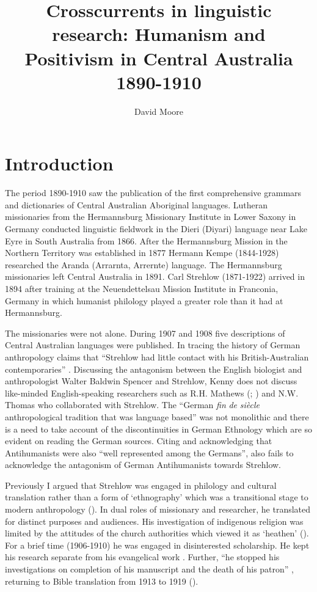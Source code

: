 \documentclass[output=paper]{langsci/langscibook}
\author{David Moore\affiliation{University of Western Australia}\orcid{}}
\title{Crosscurrents in linguistic research: Humanism and Positivism in Central Australia 1890-1910}
\begin{document}
\maketitle

\section{Introduction} 

 The period 1890-1910 saw the publication of the first comprehensive grammars and dictionaries of Central  Australian Aboriginal languages. Lutheran missionaries from the Hermannsburg Missionary Institute in Lower Saxony in Germany conducted linguistic fieldwork in the Dieri (Diyari) language near Lake Eyre in South Australia from 1866. After the Hermannsburg Mission in the Northern Territory was established in 1877 Hermann Kempe (1844-1928) researched the Aranda (Arrarnta, Arrernte) language. The Hermannsburg missionaries left Central Australia in 1891. Carl Strehlow (1871-1922) arrived in 1894 after training at the Neuendettelsau Mission Institute in Franconia, Germany in which humanist philology played a greater role than it had at Hermannsburg.
 
 The missionaries were not alone. During 1907 and 1908 five descriptions of Central Australian languages were published. In tracing the history of German anthropology \citet[51]{Kenny2013} claims that “Strehlow had little contact with his British-Australian contemporaries” \citep[51]{kenny_arandas_2013}. Discussing the antagonism between the English biologist and anthropologist Walter Baldwin Spencer and Strehlow, Kenny does not discuss like-minded English-speaking researchers such as R.H. Mathews (\citealt{mathews_arranda_1907}; \citealt{thomas_culture_2007}) and N.W. Thomas who collaborated with Strehlow. The “German \textit{fin} \textit{de} \textit{siècle} anthropological tradition that was language based” \citep[99]{kenny_arandas_2013} was not monolithic and there is a need to take account of the discontinuities in German Ethnology which are so evident on reading the German sources. Citing \citet{monteath_globalising_2013} and acknowledging that Antihumanists were also “well represented among the Germans”, \citet[228]{kenny_arandas_2013} also fails to acknowledge the antagonism of German Antihumanists towards Strehlow.
 
 Previously I argued that Strehlow was engaged in philology and cultural translation rather than a form of ‘ethnography’ which was a transitional stage to modern anthropology (\citealt[336]{harding_indigenous_2018}). In dual roles of missionary and researcher, he translated for distinct purposes and audiences. His investigation of indigenous religion was limited by the attitudes of the church authorities which viewed it as ‘heathen’ (\citealt[338]{harding_indigenous_2018}).  For a brief time (1906-1910) he was engaged in disinterested scholarship. He kept his research separate from his evangelical work \citep[232]{brock_evangelism_2017}. Further, “he stopped his investigations on completion of his manuscript and the death of his patron” \citep[236]{brock_evangelism_2017}, returning to Bible translation from 1913 to 1919 (\citealt[336]{harding_indigenous_2018}).
 
\end{document}
